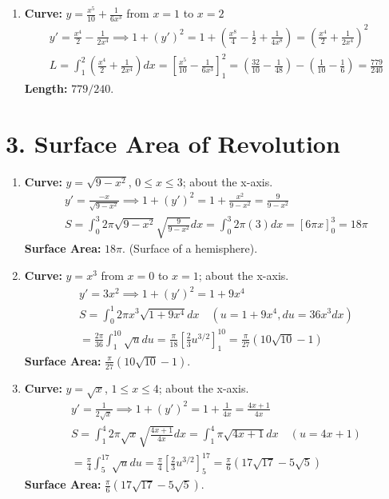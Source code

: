 \documentclass[12pt]{article}
\newcommand{\problemsettitle}[1]{\section*{#1}}
\begin{document}
\begin{enumerate}
    \item \textbf{Curve:} $y = \frac{x^5}{10} + \frac{1}{6x^3}$ from $x=1$ to $x=2$
    \begin{align*}
        y' = \frac{x^4}{2} - \frac{1}{2x^4} \implies 1+(y')^2 = 1+(\frac{x^8}{4}-\frac{1}{2}+\frac{1}{4x^8}) = (\frac{x^4}{2}+\frac{1}{2x^4})^2 \\
        L = \int_1^2 (\frac{x^4}{2}+\frac{1}{2x^4})dx = [\frac{x^5}{10}-\frac{1}{6x^3}]_1^2 = (\frac{32}{10}-\frac{1}{48}) - (\frac{1}{10}-\frac{1}{6}) = \frac{779}{240}
    \end{align*}
    \textbf{Length:} $779/240$.
\end{enumerate}

\newpage
\problemsettitle{3. Surface Area of Revolution}
\begin{enumerate}
    \item \textbf{Curve:} $y = \sqrt{9-x^2}$, $0 \le x \le 3$; about the x-axis.
    \begin{align*}
        y' = \frac{-x}{\sqrt{9-x^2}} \implies 1+(y')^2 = 1+\frac{x^2}{9-x^2} = \frac{9}{9-x^2} \\
        S = \int_0^3 2\pi\sqrt{9-x^2} \sqrt{\frac{9}{9-x^2}} dx = \int_0^3 2\pi(3) dx = [6\pi x]_0^3 = 18\pi
    \end{align*}
    \textbf{Surface Area:} $18\pi$. (Surface of a hemisphere).

    \item \textbf{Curve:} $y = x^3$ from $x=0$ to $x=1$; about the x-axis.
    \begin{align*}
        y' = 3x^2 \implies 1+(y')^2 = 1+9x^4 \\
        S = \int_0^1 2\pi x^3 \sqrt{1+9x^4} dx \quad (u=1+9x^4, du=36x^3 dx) \\
        = \frac{2\pi}{36}\int_1^{10} \sqrt{u} du = \frac{\pi}{18} [\frac{2}{3}u^{3/2}]_1^{10} = \frac{\pi}{27}(10\sqrt{10}-1)
    \end{align*}
    \textbf{Surface Area:} $\frac{\pi}{27}(10\sqrt{10}-1)$.

    \item \textbf{Curve:} $y=\sqrt{x}$, $1 \le x \le 4$; about the x-axis.
    \begin{align*}
        y' = \frac{1}{2\sqrt{x}} \implies 1+(y')^2 = 1+\frac{1}{4x} = \frac{4x+1}{4x} \\
        S = \int_1^4 2\pi \sqrt{x} \sqrt{\frac{4x+1}{4x}} dx = \int_1^4 \pi \sqrt{4x+1} dx \quad (u=4x+1) \\
        = \frac{\pi}{4}\int_5^{17} \sqrt{u} du = \frac{\pi}{4}[\frac{2}{3}u^{3/2}]_5^{17} = \frac{\pi}{6}(17\sqrt{17}-5\sqrt{5})
    \end{align*}
    \textbf{Surface Area:} $\frac{\pi}{6}(17\sqrt{17}-5\sqrt{5})$.


\end{enumerate}
\end{document}
